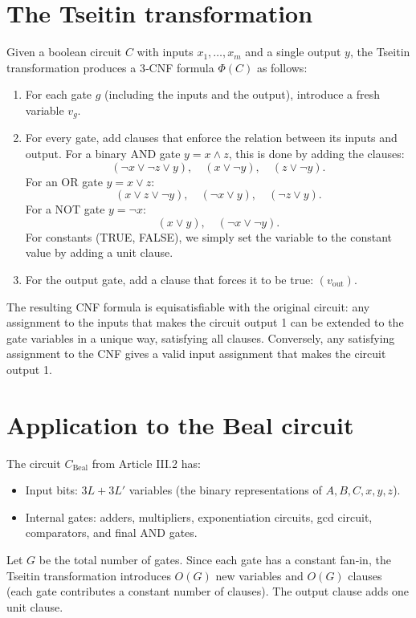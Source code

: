 \documentclass[11pt,a4paper]{article}
\begin{document}
\section{The Tseitin transformation}

Given a boolean circuit \(C\) with inputs \(x_1,\dots,x_m\) and a single output \(y\), the Tseitin transformation produces a 3‑CNF formula \(\Phi(C)\) as follows:

\begin{enumerate}
\item For each gate \(g\) (including the inputs and the output), introduce a fresh variable \(v_g\).
\item For every gate, add clauses that enforce the relation between its inputs and output. For a binary AND gate \(y = x \land z\), this is done by adding the clauses:
   \[
   (\neg x \lor \neg z \lor y),\quad (x \lor \neg y),\quad (z \lor \neg y).
   \]
   For an OR gate \(y = x \lor z\):
   \[
   (x \lor z \lor \neg y),\quad (\neg x \lor y),\quad (\neg z \lor y).
   \]
   For a NOT gate \(y = \neg x\):
   \[
   (x \lor y),\quad (\neg x \lor \neg y).
   \]
   For constants (TRUE, FALSE), we simply set the variable to the constant value by adding a unit clause.
\item For the output gate, add a clause that forces it to be true: \((v_{\text{out}})\).
\end{enumerate}

The resulting CNF formula is equisatisfiable with the original circuit: any assignment to the inputs that makes the circuit output 1 can be extended to the gate variables in a unique way, satisfying all clauses. Conversely, any satisfying assignment to the CNF gives a valid input assignment that makes the circuit output 1.

\section{Application to the Beal circuit}

The circuit \(C_{\text{Beal}}\) from Article III.2 has:
\begin{itemize}
\item Input bits: \(3L + 3L'\) variables (the binary representations of \(A,B,C,x,y,z\)).
\item Internal gates: adders, multipliers, exponentiation circuits, gcd circuit, comparators, and final AND gates.
\end{itemize}
Let \(G\) be the total number of gates. Since each gate has a constant fan‑in, the Tseitin transformation introduces \(O(G)\) new variables and \(O(G)\) clauses (each gate contributes a constant number of clauses). The output clause adds one unit clause.
\end{document}
